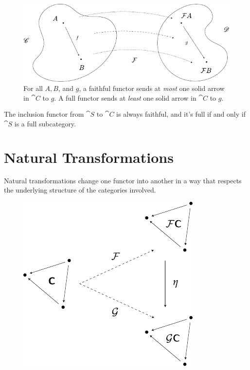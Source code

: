 \documentclass[twoside,10pt]{report}
\begin{document}
\begin{figure}[H]
	\centering
	\includegraphics[scale=1]{fig/faith-full.pdf}
	\caption{For all $A, B$, and $g$, a faithful functor sends at \textit{most} one solid arrow in $\cat{C}$ to $g$. A full functor sends at \textit{least} one solid arrow in $\cat{C}$ to $g$.}
\end{figure}

\begin{ex}
The inclusion functor from $\cat{S}$ to $\cat{C}$ is always faithful, and it's full if and only if $\cat{S}$ is a full subcategory.
\end{ex}


\section{Natural Transformations}

Natural transformations change one functor into another in a way that respects the underlying structure of the categories involved.
\begin{figure}[H]
	\centering
	\includegraphics[scale=1]{fig/nat-trans.pdf}
\end{figure}
\end{document}
